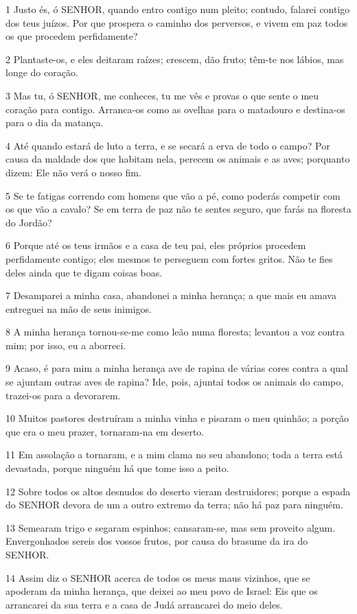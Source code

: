 \par 1 Justo és, ó SENHOR, quando entro contigo num pleito; contudo, falarei contigo dos teus juízos. Por que prospera o caminho dos perversos, e vivem em paz todos os que procedem perfidamente?
\par 2 Plantaste-os, e eles deitaram raízes; crescem, dão fruto; têm-te nos lábios, mas longe do coração.
\par 3 Mas tu, ó SENHOR, me conheces, tu me vês e provas o que sente o meu coração para contigo. Arranca-os como as ovelhas para o matadouro e destina-os para o dia da matança.
\par 4 Até quando estará de luto a terra, e se secará a erva de todo o campo? Por causa da maldade dos que habitam nela, perecem os animais e as aves; porquanto dizem: Ele não verá o nosso fim.
\par 5 Se te fatigas correndo com homens que vão a pé, como poderás competir com os que vão a cavalo? Se em terra de paz não te sentes seguro, que farás na floresta do Jordão?
\par 6 Porque até os teus irmãos e a casa de teu pai, eles próprios procedem perfidamente contigo; eles mesmos te perseguem com fortes gritos. Não te fies deles ainda que te digam coisas boas.
\par 7 Desamparei a minha casa, abandonei a minha herança; a que mais eu amava entreguei na mão de seus inimigos.
\par 8 A minha herança tornou-se-me como leão numa floresta; levantou a voz contra mim; por isso, eu a aborreci.
\par 9 Acaso, é para mim a minha herança ave de rapina de várias cores contra a qual se ajuntam outras aves de rapina? Ide, pois, ajuntai todos os animais do campo, trazei-os para a devorarem.
\par 10 Muitos pastores destruíram a minha vinha e pisaram o meu quinhão; a porção que era o meu prazer, tornaram-na em deserto.
\par 11 Em assolação a tornaram, e a mim clama no seu abandono; toda a terra está devastada, porque ninguém há que tome isso a peito.
\par 12 Sobre todos os altos desnudos do deserto vieram destruidores; porque a espada do SENHOR devora de um a outro extremo da terra; não há paz para ninguém.
\par 13 Semearam trigo e segaram espinhos; cansaram-se, mas sem proveito algum. Envergonhados sereis dos vossos frutos, por causa do brasume da ira do SENHOR.
\par 14 Assim diz o SENHOR acerca de todos os meus maus vizinhos, que se apoderam da minha herança, que deixei ao meu povo de Israel: Eis que os arrancarei da sua terra e a casa de Judá arrancarei do meio deles.
